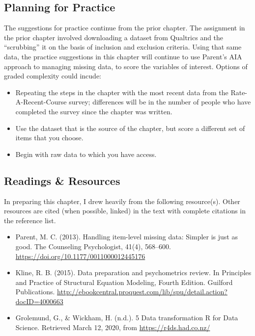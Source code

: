 \documentclass[
  11pt,
]{book}
\providecommand{\tightlist}{%
  \setlength{\itemsep}{0pt}\setlength{\parskip}{0pt}}
\begin{document}
\hypertarget{planning-for-practice-1}{%
\subsection{Planning for Practice}\label{planning-for-practice-1}}

The suggestions for practice continue from the prior chapter. The assignment in the prior chapter involved downloading a dataset from Qualtrics and the ``scrubbing'' it on the basis of inclusion and exclusion criteria. Using that same data, the practice suggestions in this chapter will continue to use Parent's \citeyearpar{parent_handling_2013} AIA approach to managing missing data, to score the variables of interest. Options of graded complexity could incude:

\begin{itemize}
\tightlist
\item
  Repeating the steps in the chapter with the most recent data from the Rate-A-Recent-Course survey; differences will be in the number of people who have completed the survey since the chapter was written.
\item
  Use the dataset that is the source of the chapter, but score a different set of items that you choose.
\item
  Begin with raw data to which you have access.
\end{itemize}

\hypertarget{readings-resources-1}{%
\subsection{Readings \& Resources}\label{readings-resources-1}}

In preparing this chapter, I drew heavily from the following resource(s). Other resources are cited (when possible, linked) in the text with complete citations in the reference list.

\begin{itemize}
\item
  Parent, M. C. (2013). Handling item-level missing data: Simpler is just as good. The Counseling Psychologist, 41(4), 568--600. \url{https://doi.org/10.1177/0011000012445176}
\item
  Kline, R. B. (2015). Data preparation and psychometrics review. In Principles and Practice of Structural Equation Modeling, Fourth Edition. Guilford Publications. \url{http://ebookcentral.proquest.com/lib/spu/detail.action?docID=4000663}
\item
  Grolemund, G., \& Wickham, H. (n.d.). 5 Data transformation \textbar{} R for Data Science. Retrieved March 12, 2020, from \url{https://r4ds.had.co.nz/}
\end{itemize}
\end{document}
